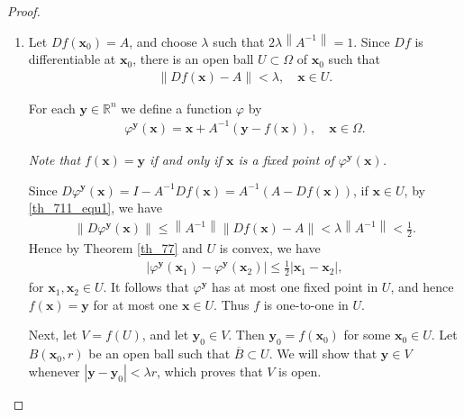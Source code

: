\documentclass[10pt]{book}
\theoremstyle{definition}
\numberwithin{equation}{chapter}
\begin{document}
\begin{proof}
~\begin{enumerate}[label=(\alph*)]
    \item Let $Df(\mathbf{x}_0) = A$, and choose $\lambda$ such that $2 \lambda \left\|A^{-1}\right\| = 1$. Since $Df$ is differentiable at $\mathbf{x}_0$, there is an open ball $U \subset \Omega$ of $\mathbf{x}_0$ such that 
    \begin{align}\label{th_711_equ1}
        \left\|Df(\mathbf{x}) - A\right\| < \lambda, \quad \mathbf{x} \in U.
    \end{align}
    
    For each $\mathbf{y} \in \mathbb{R}^n$ we define a function $\varphi$ by
    \begin{align*}
        \varphi^{\mathbf{y}}(\mathbf{x}) = \mathbf{x} + A^{-1} \left(\mathbf{y} - f(\mathbf{x})\right), \quad \mathbf{x} \in \Omega.
    \end{align*}
    
    {\em Note that $f(\mathbf{x}) = \mathbf{y}$ if and only if $\mathbf{x}$ is a fixed point of $\varphi^{\mathbf{y}}(\mathbf{x})$.} 
    
    Since $D\varphi^{\mathbf{y}}(\mathbf{x}) = I - A^{-1} Df(\mathbf{x}) = A^{-1}\left(A - Df(\mathbf{x})\right)$, if $\mathbf{x} \in U$, by \ref{th_711_equ1}, we have
    \begin{align*}
        \left\|D\varphi^{\mathbf{y}}(\mathbf{x})\right\| \leq \left\|A^{-1}\right\| \left\|Df(\mathbf{x}) - A\right\| < \lambda \left\|A^{-1}\right\| < \frac{1}{2}.
    \end{align*}
    Hence by Theorem \ref{th_77} and $U$ is convex, we have
    \begin{align}\label{th_711_equ2}
        \left|\varphi^{\mathbf{y}}(\mathbf{x}_1) - \varphi^{\mathbf{y}}(\mathbf{x}_2)\right| \leq \frac{1}{2} \left|\mathbf{x}_1 - \mathbf{x}_2\right|,
    \end{align}
    for $\mathbf{x}_1, \mathbf{x}_2 \in U$. It follows that $\varphi^{\mathbf{y}}$ has at most one fixed point in $U$, and hence $f(\mathbf{x}) = \mathbf{y}$ for at most one $\mathbf{x} \in U$. Thus $f$ is one-to-one in $U$.
    
    \medskip
    
    Next, let $V = f(U)$, and let $\mathbf{y}_0 \in V$. Then $\mathbf{y}_0 = f(\mathbf{x}_0)$ for some $\mathbf{x}_0 \in U$. Let $B(\mathbf{x}_0,r)$ be an open ball such that $\overline{B} \subset U$. We will show that $\mathbf{y} \in V$ whenever $\left|\mathbf{y} - \mathbf{y}_0\right| < \lambda r$, which proves that $V$ is open.
    

\end{enumerate}
\end{proof}
\end{document}
